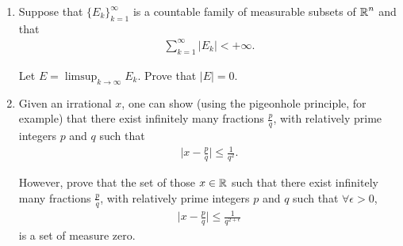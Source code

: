 \documentclass[UTF8,a4paper,10pt]{article}
\begin{document}


  

  \begin{Problem}[]{
    }

    \begin{enumerate}[label=(\alph*)]
      \item     
      Suppose that \(\{E_k\}_{k=1}^{\infty}\) is a countable family of measurable subsets of \(\operatorname{\mathbb{R}}^n\) and that
      \begin{equation*}
        \begin{aligned}
          \sum_{k=1}^{\infty}|E_k|<+\infty.
        \end{aligned}
      \end{equation*}

      Let \(E = \limsup_{k\to\infty}E_k\). Prove that \(|E| = 0\).
      \item 
      Given an irrational \(x\), one can show (using the pigeonhole principle, for example) that there exist infinitely many fractions \(\frac{p}{q}\), with relatively prime integers \(p\) and \(q\) such that 
      \begin{equation*}
        \begin{aligned}
          \bigg| x-\frac{p}{q} \bigg|\leq\frac{1}{q^2}.
        \end{aligned}
      \end{equation*}

    However, prove that the set of those \(x\in \operatorname{\mathbb{R}}\) such that there exist infinitely many fractions \(\frac{p}{q}\), with relatively prime integers \(p\) and \(q\) such that 
    \(\forall\epsilon > 0\), 
    \begin{equation*}
      \begin{aligned}
        \bigg| x-\frac{p}{q} \bigg|\leq\frac{1}{q^{2+\epsilon}}
      \end{aligned}
    \end{equation*}
    is a set of measure zero.

    \end{enumerate}  
  \end{Problem}

  \begin{solution}\,



  \end{solution}
  \pagebreak

\end{document}
